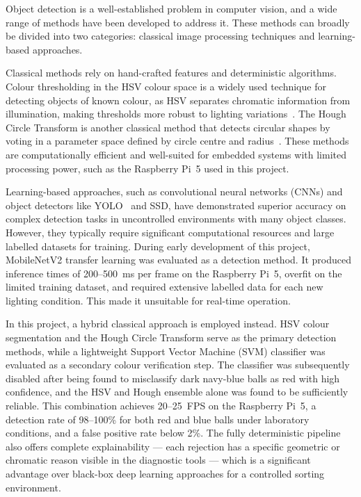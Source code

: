 \label{sec:related-detection}

Object detection is a well-established problem in computer vision, and a wide range of
methods have been developed to address it. These methods can broadly be divided into two
categories: classical image processing techniques and learning-based approaches.

Classical methods rely on hand-crafted features and deterministic algorithms. Colour
thresholding in the HSV colour space is a widely used technique for detecting objects of known
colour, as HSV separates chromatic information from illumination, making thresholds more
robust to lighting variations~\cite{bradski2008learning}. The Hough Circle Transform is
another classical method that detects circular shapes by voting in a parameter space defined
by circle centre and radius~\cite{hough1962method}. These methods are computationally
efficient and well-suited for embedded systems with limited processing power, such as the
Raspberry Pi~5 used in this project.

Learning-based approaches, such as convolutional neural networks (CNNs) and object
detectors like YOLO~\cite{redmon2016yolo} and SSD, have demonstrated superior accuracy on
complex detection tasks in uncontrolled environments with many object classes. However, they
typically require significant computational resources and large labelled datasets for training.
During early development of this project, MobileNetV2 transfer learning was evaluated as a
detection method. It produced inference times of 200--500~ms per frame on the Raspberry
Pi~5, overfit on the limited training dataset, and required extensive labelled data for each
new lighting condition. This made it unsuitable for real-time operation.

In this project, a hybrid classical approach is employed instead. HSV colour segmentation
and the Hough Circle Transform serve as the primary detection methods, while a lightweight
Support Vector Machine (SVM) classifier was evaluated as a secondary colour verification
step. The classifier was subsequently disabled after being found to misclassify dark
navy-blue balls as red with high confidence, and the HSV and Hough ensemble alone was
found to be sufficiently reliable. This combination achieves 20--25~FPS on the Raspberry
Pi~5, a detection rate of 98--100\% for both red and blue balls under laboratory conditions,
and a false positive rate below 2\%. The fully deterministic pipeline also offers complete
explainability --- each rejection has a specific geometric or chromatic reason visible in the
diagnostic tools --- which is a significant advantage over black-box deep learning approaches
for a controlled sorting environment.
